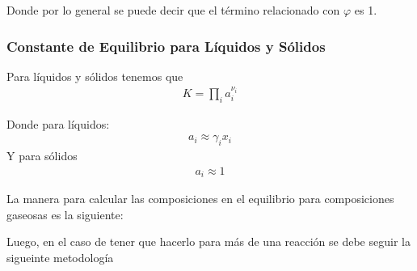 Donde por lo general se puede decir que el término relacionado con $\varphi$ es 1.

\subsubsection{Constante de Equilibrio para Líquidos y Sólidos}
Para líquidos y sólidos tenemos que 
\begin{align}
    K=\prod_i a_i^{\nu_i}
\end{align}

Donde para líquidos:
\begin{align}
    a_i\approx\gamma_ix_i
\end{align}
Y para sólidos 
\begin{align}
    a_i\approx 1
\end{align}

La manera para calcular las composiciones en el equilibrio para composiciones gaseosas es la siguiente:


Luego, en el caso de tener que hacerlo para más de una reacción se debe seguir la sigueinte metodología

